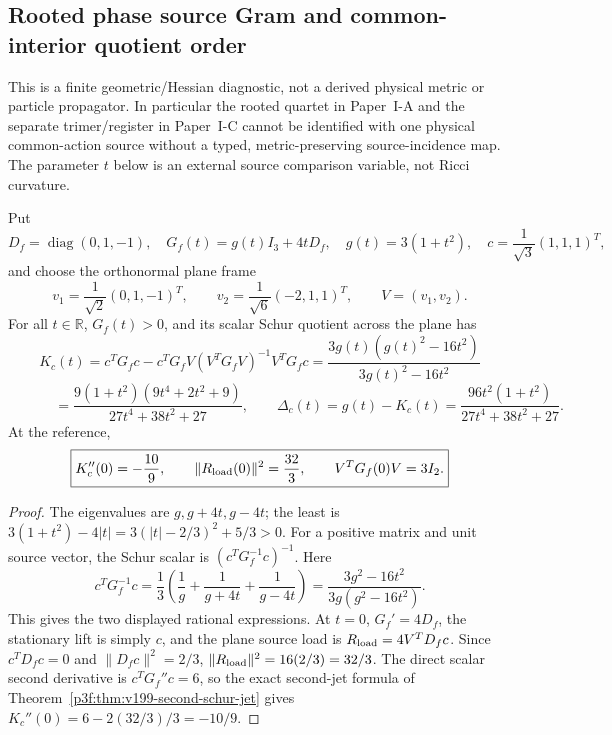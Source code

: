 \documentclass[11pt,a4paper]{article}
\begin{document}
\subsection{Rooted phase source Gram and common-interior quotient order}
\label{p3g:sec:v244-rooted-phase-schur}
This is a finite geometric/Hessian diagnostic, not a derived physical
metric or particle propagator.  In particular the rooted quartet in
Paper~I-A and the separate trimer/register in Paper~I-C cannot be
identified with one physical common-action source without a typed,
metric-preserving source-incidence map.  The parameter \(t\) below
is an external source comparison variable, not Ricci curvature.

\begin{proposition}
\label{p3g:prop:v244-rooted-phase-schur-proof}
Put
\[
 D_f=\operatorname{diag}(0,1,-1),\quad
 G_f(t)=g(t)I_3+4tD_f,\quad g(t)=3(1+t^2),\quad
 c=\frac1{\sqrt3}(1,1,1)^T,
\]
and choose the orthonormal plane frame
\[
 v_1=\frac1{\sqrt2}(0,1,-1)^T,\qquad
 v_2=\frac1{\sqrt6}(-2,1,1)^T,\qquad V=(v_1,v_2).
\]
For all \(t\in\mathbb R\), \(G_f(t)>0\), and its scalar Schur
quotient across the plane has
\[
 \boxed{K_c(t)=
 c^TG_fc-c^TG_fV(V^TG_fV)^{-1}V^TG_fc
 =\frac{3g(t)(g(t)^2-16t^2)}{3g(t)^2-16t^2}}
\]
\[
 \boxed{\phantom{K_c(t)}=
 \frac{9(1+t^2)(9t^4+2t^2+9)}{27t^4+38t^2+27},\qquad
 \Delta_c(t)=g(t)-K_c(t)
 =\frac{96t^2(1+t^2)}{27t^4+38t^2+27}.}
\]
At the reference,
\[
 \boxed{K_c''(0)=-\frac{10}{9},\qquad
 \|R_{\rm load}(0)\|^2=\frac{32}{3},\qquad
 V^TG_f(0)V=3I_2.}
\]
\end{proposition}
\begin{proof}
The eigenvalues are \(g,g+4t,g-4t\); the least is
\(3(1+t^2)-4|t|=3(|t|-2/3)^2+5/3>0\).
For a positive matrix and unit source vector, the Schur scalar is
\((c^TG_f^{-1}c)^{-1}\).  Here
\[
 c^TG_f^{-1}c=\frac13\left(\frac1g+
 \frac1{g+4t}+\frac1{g-4t}\right)
 =\frac{3g^2-16t^2}{3g(g^2-16t^2)}.
\]
This gives the two displayed rational expressions.  At \(t=0\),
\(G_f'=4D_f\), the stationary lift is simply \(c\), and the
plane source load is \(R_{\rm load}=4V^TD_fc\).  Since
\(c^TD_fc=0\) and \(\|D_fc\|^2=2/3\),
\(\|R_{\rm load}\|^2=16(2/3)=32/3\).  The direct scalar
second derivative is \(c^TG_f''c=6\), so the exact second-jet
formula of Theorem~\ref{p3f:thm:v199-second-schur-jet} gives
\(K_c''(0)=6-2(32/3)/3=-10/9\).
\end{proof}
\end{document}
